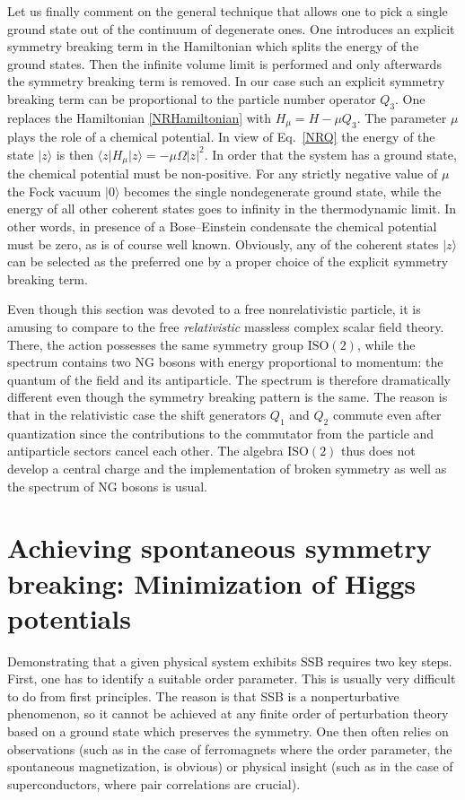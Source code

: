 \documentclass[final,3p,times,12pt,a4paper,sort&compress]{elsarticle}
\newcommand\gr[1]{\mathrm{#1}}              %
\newcommand\bra[1]{\langle#1\vert}          %
\newcommand\ket[1]{\vert#1\rangle}          %
\newcommand\abs[1]{\left|#1\right|}         %
\begin{document}
Let us finally comment on the general technique that allows one to pick a
single ground state out of the continuum of degenerate ones. One introduces an
explicit symmetry breaking term in the Hamiltonian which splits the energy of
the ground states. Then the infinite volume limit is performed and only
afterwards the symmetry breaking term is removed. In our case such an explicit
symmetry breaking term can be proportional to the particle number operator
$Q_3$. One replaces the Hamiltonian \eqref{NRHamiltonian} with $H_\mu=H-\mu
Q_3$. The parameter $\mu$ plays the role of a chemical potential. In view of
Eq.~\eqref{NRQ} the energy of the state $\ket z$ is then $\bra zH_\mu\ket
z=-\mu\Omega\abs z^2$. In order that the system has a ground state, the
chemical potential must be non-positive. For any strictly negative value of
$\mu$ the Fock vacuum $\ket0$ becomes the single nondegenerate ground state,
while the energy of all other coherent states goes to infinity in the
thermodynamic limit. In other words, in presence of a Bose--Einstein condensate
the chemical potential must be zero, as is of course well known. Obviously, any
of the coherent states $\ket z$ can be selected as the preferred one by a proper
choice of the explicit symmetry breaking term.

Even though this section was devoted to a free nonrelativistic particle, it is
amusing to compare to the free \emph{relativistic} massless complex scalar
field theory. There, the action possesses the same symmetry group
$\gr{ISO(2)}$, while the spectrum contains two NG bosons with energy
proportional to momentum: the quantum of the field and its antiparticle. The
spectrum is therefore dramatically different even though the symmetry breaking
pattern is the same. The reason is that in the relativistic case the shift
generators $Q_1$ and $Q_2$ commute even after quantization since the
contributions to the commutator from the particle and antiparticle sectors
cancel each other. The algebra $\gr{ISO(2)}$ thus does not develop a
central charge and the implementation of broken symmetry as well as the
spectrum of NG bosons is usual.


\section{Achieving spontaneous symmetry breaking: Minimization of Higgs
potentials}
\label{sec:higgs}
Demonstrating that a given physical system exhibits SSB requires two
key steps. First, one has to identify a suitable order parameter. This is
usually very difficult to do from first principles. The reason is that SSB is a
nonperturbative phenomenon, so it cannot be achieved at any finite order of
perturbation theory based on a ground state which preserves the symmetry. One
then often relies on observations (such as in the case of ferromagnets
where the order parameter, the spontaneous magnetization, is obvious) or
physical insight (such as in the case of superconductors, where pair
correlations are crucial).
\end{document}
